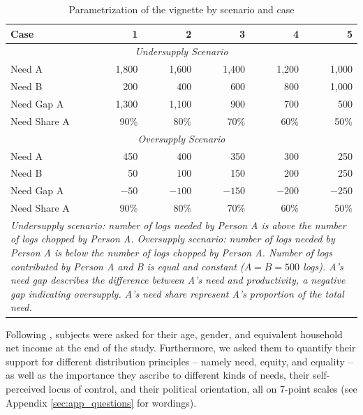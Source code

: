 \documentclass[egregdoesnotlikesansseriftitles]{scrartcl}
\begin{document}
\begin{table}[ht]
   \centering
   \caption{Parametrization of the vignette by scenario and case}\label{tab:cases}
   \begin{tabular}{lrrrrr}\\[0.5ex]\hline
      Case                    & 1        & 2        & 3        & 4        & 5        \\\hline\hline
      \multicolumn{6}{c}{\textit{Undersupply Scenario}}                              \\
      Need A                  & 1,800    & 1,600    & 1,400    & 1,200    & 1,000    \\
      Need B                  &   200    &   400    &   600    &   800    & 1,000    \\
      Need Gap A              & 1,300    & 1,100    &   900    &   700    &   500    \\
      Need Share A            & 90\%     & 80\%     & 70\%     & 60\%     & 50\%     \\\hline
      \multicolumn{6}{c}{\textit{Oversupply Scenario}}                               \\
      Need A                  &   450    &   400    &   350    &   300    &   250    \\
      Need B                  &    50    &   100    &   150    &   200    &   250    \\
      Need Gap A              &  $-50$   & $-100$   & $-150$   & $-200$   & $-250$   \\
      Need Share A            & 90\%     & 80\%     & 70\%     & 60\%     & 50\%     \\\hline
      \multicolumn{6}{p{9cm}}{\footnotesize{\textit{Undersupply scenario: number of logs needed by Person A is above the number of logs chopped by Person A. Oversupply scenario: number of logs needed by Person A is below the number of logs chopped by Person A. Number of logs contributed by Person A and B is equal and constant ($A=B=500$ logs). A's need gap describes the difference between A's need and productivity, a negative gap indicating oversupply. A's need share represent A's proportion of the total need.}}}
   \end{tabular}
\end{table}

Following \cite{bauer_need_2020}, subjects were asked for their age, gender, and equivalent household net income at the end of the study.
Furthermore, we asked them to quantify their support for different distribution principles -- namely need, equity, and equality -- as well as the importance they ascribe to different kinds of needs, their self-perceived locus of control, and their political orientation, all on 7-point scales (see Appendix \ref{sec:app_questions} for wordings).
\end{document}
